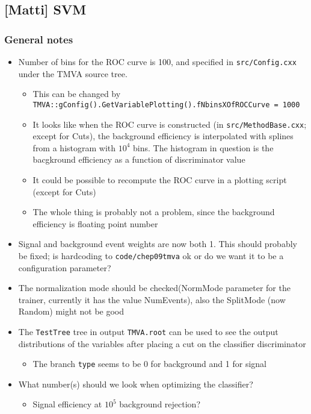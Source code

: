 \subsection{[Matti] SVM}

\subsubsection{General notes}
\begin{itemize}
\item Number of bins for the ROC curve is 100, and specified in
  \texttt{src/Config.cxx} under the TMVA source tree.
  \begin{itemize}
  \item This can be changed by \texttt{TMVA::gConfig().GetVariablePlotting().fNbinsXOfROCCurve = 1000}
  \item It looks like when the ROC curve is constructed (in
    \texttt{src/MethodBase.cxx}; except for Cuts), the background
    efficiency is interpolated with splines from a histogram with
    $10^4$ bins. The histogram in question is the bacgkround
    efficiency as a function of discriminator value
  \item It could be possible to recompute the ROC curve in a plotting
    script (except for Cuts)
  \item The whole thing is probably not a problem, since the
    background efficiency is floating point number
  \end{itemize}
\item Signal and background event weights are now both 1. This should
  probably be fixed; is hardcoding to \texttt{code/chep09tmva} ok or
  do we want it to be a configuration parameter?
\item The normalization mode should be checked(NormMode parameter for
  the trainer, currently it has the value NumEvents), also the
  SplitMode (now Random) might not be good
\item The \texttt{TestTree} tree in output \texttt{TMVA.root} can be
  used to see the output distributions of the variables after placing
  a cut on the classifier discriminator
  \begin{itemize}
  \item The branch \texttt{type} seems to be 0 for background and 1 for signal
  \end{itemize}
\item What number(s) should we look when optimizing the classifier?
  \begin{itemize}
  \item Signal efficiency at $10^5$ background rejection?
  \end{itemize}
\end{itemize}

